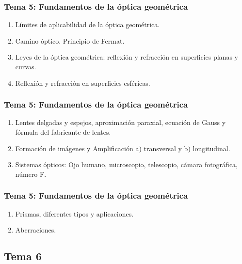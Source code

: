 \documentclass[12pt]{beamer}
\begin{document}
\begin{frame}
\frametitle{\textbf{Tema 5: Fundamentos de la óptica geométrica}}
\begin{enumerate}[<+->]
\item Límites de aplicabilidad de la óptica geométrica.
\item Camino óptico. Principio de Fermat.
\item Leyes de la óptica geométrica: reflexión y refracción en superficies planas y curvas.
\item Reflexión y refracción en superficies esféricas.
\seti
\end{enumerate}
\end{frame}
\begin{frame}
\frametitle{\textbf{Tema 5: Fundamentos de la óptica geométrica}}
\begin{enumerate}[<+->]
\conti
\item Lentes delgadas y espejos, aproximación paraxial, ecuación de Gauss y fórmula del fabricante de lentes.
\item Formación de imágenes y Amplificación a) transversal y b) longitudinal.
\item Sistemas ópticos: Ojo humano, microscopio, telescopio, cámara fotográfica, número F.
\seti
\end{enumerate}
\end{frame}
\begin{frame}
\frametitle{\textbf{Tema 5: Fundamentos de la óptica geométrica}}
\begin{enumerate}[<+->]
\conti
\item Prismas, diferentes tipos y aplicaciones.
\item Aberraciones.
\end{enumerate}
\end{frame}

\subsection*{Tema 6}
\end{document}
